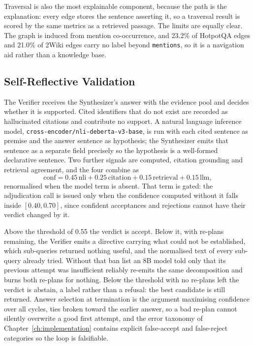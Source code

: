 Traversal is also the most explainable component, because the path is the
explanation: every edge stores the sentence asserting it, so a traversal
result is scored by the same metrics as a retrieved passage. The limits are
equally clear. The graph is induced from mention co-occurrence, and 23.2\% of
HotpotQA edges and 21.0\% of 2Wiki edges carry no label beyond
\texttt{mentions}, so it is a navigation aid rather than a knowledge base.

\subsection{Self-Reflective Validation}
\label{sec:verification}

The Verifier receives the Synthesizer's answer with the evidence pool and
decides whether it is supported. Cited identifiers that do not exist are
recorded as hallucinated citations and contribute no support. A natural
language inference model, \texttt{cross-encoder/nli-deberta-v3-base}, is run
with each cited sentence as premise and the answer sentence as hypothesis; the
Synthesizer emits that sentence as a separate field precisely so the hypothesis
is a well-formed declarative sentence. Two further signals are computed,
citation grounding and retrieval agreement, and the four combine as
\[
  \mathrm{conf} = 0.45\,\mathrm{nli} + 0.25\,\mathrm{citation}
                + 0.15\,\mathrm{retrieval} + 0.15\,\mathrm{llm},
\]
renormalised when the model term is absent. That term is gated: the
adjudication call is issued only when the confidence computed without it falls
inside $[0.40, 0.70]$, since confident acceptances and rejections cannot have
their verdict changed by it.

Above the threshold of 0.55 the verdict is accept. Below it, with re-plans
remaining, the Verifier emits a directive carrying what could not be
established, which sub-queries returned nothing useful, and the normalised
text of every sub-query already tried. Without that ban list an 8B model told
only that its previous attempt was insufficient reliably re-emits the same
decomposition and burns both re-plans for nothing. Below the threshold with no
re-plans left the verdict is abstain, a label rather than a refusal: the best
candidate is still returned. Answer selection at termination is the argument
maximising confidence over all cycles, ties broken toward the earlier answer,
so a bad re-plan cannot silently overwrite a good first attempt, and the error
taxonomy of Chapter~\ref{ch:implementation} contains explicit false-accept and
false-reject categories so the loop is falsifiable.

